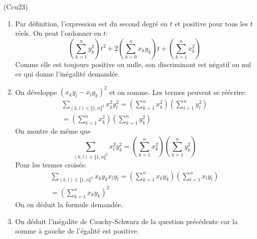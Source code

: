 \begin{tiny}(Ccu23)\end{tiny}
\begin{enumerate}
 \item Par définition, l'expression est du second degré en $t$ et positive pour tous les $t$ réels. On peut l'ordonner en $t$:
\begin{displaymath}
 \left( \sum_{k=1}^n y_k^2\right)t^2 + 2\left(\sum_{k=0}^n x_ky_k \right)t + \left( \sum_{k=1}^n x_k^2\right)
\end{displaymath}
Comme elle est toujours positive ou nulle, son discriminant est négatif ou nul ce qui donne l'inégalité demandée.

 \item On développe $(x_ky_l-x_ly_k)^2$ et on somme. Les termes peuvent se réécrire:
\begin{multline*}
 \sum_{(k,l)\in\llbracket 1,n \rrbracket^2}x_k^2y_l^2
 = \left( \sum_{k=1}^{n}x_k^2\right) \left( \sum_{l=1}^{n}y_l^2\right)\\
 = \left( \sum_{k=1}^{n}x_k^2\right) \left( \sum_{k=1}^{n}y_k^2\right)
\end{multline*}
On montre de même que
\begin{displaymath}
\sum_{(k,l)\in\llbracket 1,n \rrbracket^2}x_l^2y_k^2
= \left( \sum_{k=1}^{n}x_k^2\right) \left( \sum_{k=1}^{n}y_k^2\right)
\end{displaymath}
Pour les termes croisés:
\begin{multline*}
\sum_{(k,l)\in\llbracket 1,n \rrbracket^2}x_ky_kx_ly_l
= \left( \sum_{k=1}^{n}x_ky_k\right) \left( \sum_{l=1}^{n}x_ly_l\right)\\
= \left( \sum_{k=1}^{n}x_ky_k\right)^2
\end{multline*}
On en déduit la formule demandée.

 \item On déduit l'inégalite de Cauchy-Schwarz de la question précédente car la somme à gauche de l'égalité est positive.
\end{enumerate}
